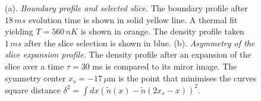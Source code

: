 		\begin{figure}[!htb]
		
        			\caption{%
        			(a). {\it Boundary profile and selected slice.} The boundary profile after $18\,ms$ evolution time is shown in solid yellow line. A thermal fit yielding $T=560\,nK$ is shown in orange.  The density profile taken $1\,ms$ after the slice selection is shown in blue. (b).  {\it Asymmetry of the slice expansion profile.} The density profile after an expansion of the slice aver a time $\tau=30$ ms is compared to its miror image. The symmetry center $x_s= -17\,\mu$m is the point that minimises the curves square distance $\delta^2=\int dx (\tilde{n}(x)-\tilde{n}(2x_s -x))^2$.  
        			}
        		\label{fig:simul_deformation}
        		
   			\end{figure} 
   		
